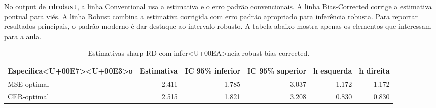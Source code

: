 \documentclass[
]{article}
\newenvironment{Shaded}{\begin{snugshade}}{\end{snugshade}}
\newcommand{\AttributeTok}[1]{\textcolor[rgb]{0.13,0.29,0.53}{#1}}
\newcommand{\CommentTok}[1]{\textcolor[rgb]{0.56,0.35,0.01}{\textit{#1}}}
\newcommand{\DecValTok}[1]{\textcolor[rgb]{0.00,0.00,0.81}{#1}}
\newcommand{\FunctionTok}[1]{\textcolor[rgb]{0.13,0.29,0.53}{\textbf{#1}}}
\newcommand{\NormalTok}[1]{#1}
\newcommand{\OtherTok}[1]{\textcolor[rgb]{0.56,0.35,0.01}{#1}}
\newcommand{\SpecialCharTok}[1]{\textcolor[rgb]{0.81,0.36,0.00}{\textbf{#1}}}
\newcommand{\StringTok}[1]{\textcolor[rgb]{0.31,0.60,0.02}{#1}}
\begin{document}
\begin{Shaded}
\end{Shaded}

No output de \texttt{rdrobust}, a linha Conventional usa a estimativa e o erro padrão convencionais. A linha Bias-Corrected corrige a estimativa pontual para viés. A linha Robust combina a estimativa corrigida com erro padrão apropriado para inferência robusta. Para reportar resultados principais, o padrão moderno é dar destaque ao intervalo robusto. A tabela abaixo mostra apenas os elementos que interessam para a aula.

\begin{table}

\caption{\label{tab:tabela-rdrobust}Estimativas sharp RD com infer<U+00EA>ncia robust bias-corrected.}
\centering
\begin{tabular}[t]{l|r|r|r|r|r}
\hline
Especifica<U+00E7><U+00E3>o & Estimativa & IC 95\% inferior & IC 95\% superior & h esquerda & h direita\\
\hline
MSE-optimal & 2.411 & 1.785 & 3.037 & 1.172 & 1.172\\
\hline
CER-optimal & 2.515 & 1.821 & 3.208 & 0.830 & 0.830\\
\hline
\end{tabular}
\end{table}
\end{document}
